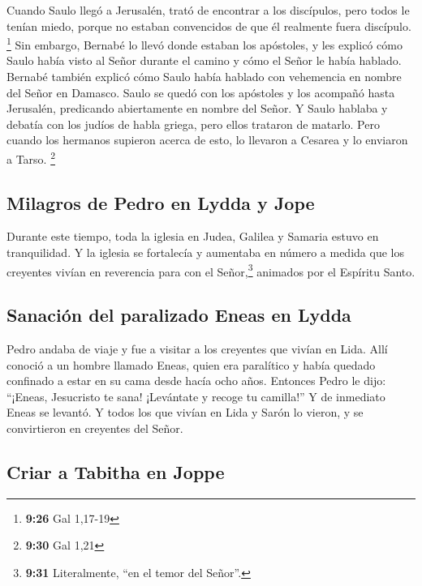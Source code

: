  Cuando Saulo llegó a Jerusalén, trató de encontrar a los
discípulos, pero todos le tenían miedo, porque no estaban convencidos de
que él realmente fuera discípulo. \footnote{\textbf{9:26} Gal 1,17-19}
 Sin embargo, Bernabé lo llevó donde estaban los
apóstoles, y les explicó cómo Saulo había visto al Señor durante el
camino y cómo el Señor le había hablado. Bernabé también explicó cómo
Saulo había hablado con vehemencia en nombre del Señor en Damasco.
 Saulo se quedó con los apóstoles y los acompañó hasta
Jerusalén,  predicando abiertamente en nombre del Señor.
Y Saulo hablaba y debatía con los judíos de habla griega, pero ellos
trataron de matarlo.  Pero cuando los hermanos supieron
acerca de esto, lo llevaron a Cesarea y lo enviaron a Tarso. \footnote{\textbf{9:30}
  Gal 1,21}

\hypertarget{milagros-de-pedro-en-lydda-y-jope}{%
\subsection{Milagros de Pedro en Lydda y
Jope}\label{milagros-de-pedro-en-lydda-y-jope}}

 Durante este tiempo, toda la iglesia en Judea, Galilea y
Samaria estuvo en tranquilidad. Y la iglesia se fortalecía y aumentaba
en número a medida que los creyentes vivían en reverencia para con el
Señor,\footnote{\textbf{9:31} Literalmente, ``en el temor del Señor''.}
animados por el Espíritu Santo.

\hypertarget{sanaciuxf3n-del-paralizado-eneas-en-lydda}{%
\subsection{Sanación del paralizado Eneas en
Lydda}\label{sanaciuxf3n-del-paralizado-eneas-en-lydda}}

 Pedro andaba de viaje y fue a visitar a los creyentes
que vivían en Lida.  Allí conoció a un hombre llamado
Eneas, quien era paralítico y había quedado confinado a estar en su cama
desde hacía ocho años.  Entonces Pedro le dijo: ``¡Eneas,
Jesucristo te sana! ¡Levántate y recoge tu camilla!'' Y de inmediato
Eneas se levantó.  Y todos los que vivían en Lida y Sarón
lo vieron, y se convirtieron en creyentes del Señor.

\hypertarget{criar-a-tabitha-en-joppe}{%
\subsection{Criar a Tabitha en Joppe}\label{criar-a-tabitha-en-joppe}}

